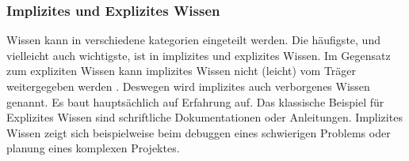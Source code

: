 \documentclass{article}
\begin{document}
\subsubsection*{Implizites und Explizites Wissen} 
Wissen kann in verschiedene kategorien eingeteilt werden. Die häufigste, und vielleicht auch wichtigste, ist in implizites und explizites Wissen. Im Gegensatz zum expliziten Wissen kann implizites Wissen nicht (leicht) vom Träger weitergegeben werden \parencite[p. 2]{FischerWewer2021}. Deswegen wird implizites auch verborgenes Wissen genannt. Es baut hauptsächlich auf Erfahrung auf. Das klassische Beispiel für Explizites Wissen sind schriftliche Dokumentationen oder Anleitungen. Implizites Wissen zeigt sich beispielweise beim debuggen eines schwierigen Problems oder planung eines komplexen Projektes.
\printbibliography
\end{document}
